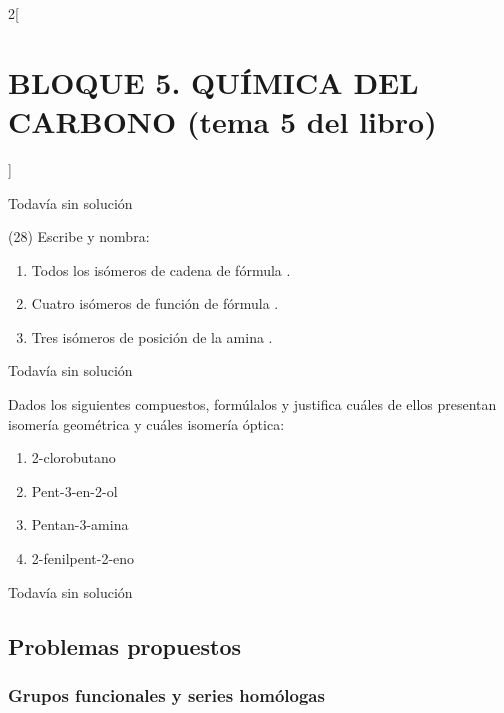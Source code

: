 \documentclass[10pt]{article}
\begin{document}
\begin{multicols}{2}[
  \section{BLOQUE 5. QUÍMICA DEL CARBONO (tema 5 del libro)}
  ]
\begin{solution}[print=false]
  Todavía sin solución
\end{solution}




\begin{exercise}[
    tags    = {},
    topics  = {química,química básica},
    source  = {FQ 1B MGH 2016, p85, e26},
  ]

  (28) Escribe y nombra:
  \begin{enumerate}
    \item Todos los isómeros de cadena de fórmula .
    \item Cuatro isómeros de función de fórmula .
    \item Tres isómeros de posición de la amina .
  \end{enumerate}
\end{exercise}

\begin{solution}[print=false]
  Todavía sin solución
\end{solution}




\begin{exercise}[
    tags    = {},
    topics  = {química,química básica},
    source  = {FQ 1B MGH 2016, p85, e26},
  ]

  Dados los siguientes compuestos, formúlalos y justifica cuáles
  de ellos presentan isomería geométrica y cuáles isomería
  óptica:
  \begin{enumerate}
    \item 2-clorobutano
    \item Pent-3-en-2-ol
    \item Pentan-3-amina
    \item 2-fenilpent-2-eno
  \end{enumerate}
\end{exercise}

\begin{solution}[print=false]
  Todavía sin solución
\end{solution}


\subsection{Problemas propuestos}

\subsubsection{Grupos funcionales y series homólogas}





\end{multicols}
\end{document}
